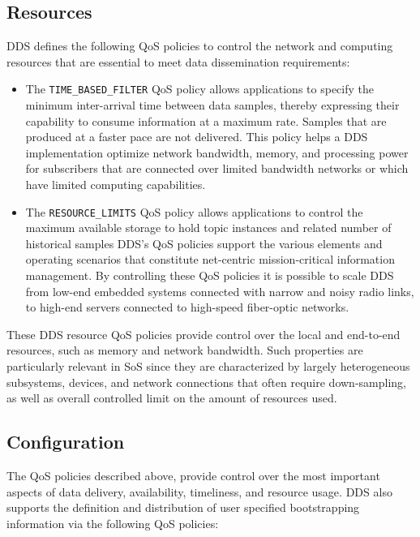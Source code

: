 \subsection{Resources} 
\ac{DDS} defines the following \ac{QoS} policies to control the
network and computing resources that are essential to meet data
dissemination requirements:
\begin{itemize}

	\item The \texttt{TIME\_BASED\_FILTER} \ac{QoS} policy allows
          applications to specify the minimum inter-arrival time
          between data samples, thereby expressing their capability to
          consume information at a maximum rate. Samples that are
          produced at a faster pace are not delivered. This policy
          helps a \ac{DDS} implementation optimize network bandwidth,
          memory, and processing power for subscribers that are
          connected over limited bandwidth networks or which have
          limited computing capabilities.

	\item The \texttt{RESOURCE\_LIMITS} \ac{QoS} policy allows
          applications to control the maximum available storage to
          hold topic instances and related number of historical
          samples \ac{DDS}’s \ac{QoS} policies support the various
          elements and operating scenarios that constitute net-centric
          mission-critical information management. By controlling
          these QoS policies it is possible to scale \ac{DDS} from
          low-end embedded systems connected with narrow and noisy
          radio links, to high-end servers connected to high-speed
          fiber-optic networks.
\end{itemize}
These \ac{DDS} resource \ac{QoS} policies provide control over the
local and end-to-end resources, such as memory and network bandwidth.
Such properties are particularly relevant in \ac{SoS} since they are
characterized by largely heterogeneous subsystems, devices, and
network connections that often require down-sampling, as well as
overall controlled limit on the amount of resources used.

\subsection{Configuration} 
The \ac{QoS} policies described above, provide control over the most
important aspects of data delivery, availability, timeliness, and
resource usage.  \ac{DDS} also supports the definition and
distribution of user specified bootstrapping information via the
following QoS policies:

